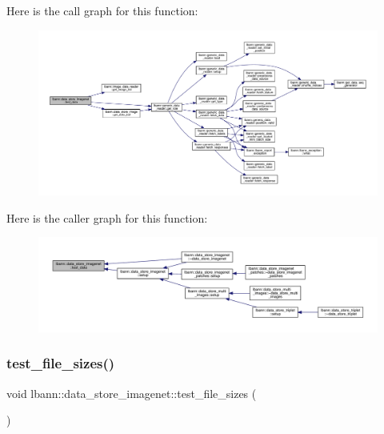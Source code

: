 Here is the call graph for this function\+:\nopagebreak
\begin{figure}[H]
\begin{center}
\leavevmode
\includegraphics[width=350pt]{classlbann_1_1data__store__imagenet_a1ed5548a409afec61489102f7f080467_cgraph}
\end{center}
\end{figure}
Here is the caller graph for this function\+:\nopagebreak
\begin{figure}[H]
\begin{center}
\leavevmode
\includegraphics[width=350pt]{classlbann_1_1data__store__imagenet_a1ed5548a409afec61489102f7f080467_icgraph}
\end{center}
\end{figure}
\mbox{\label{classlbann_1_1data__store__imagenet_a1c928ccfb4e75ffe4cefd62f37c072f8}} 
\subsubsection{\texorpdfstring{test\+\_\+file\+\_\+sizes()}{test\_file\_sizes()}}
{\footnotesize\ttfamily void lbann\+::data\+\_\+store\+\_\+imagenet\+::test\+\_\+file\+\_\+sizes (\begin{DoxyParamCaption}{ }\end{DoxyParamCaption})\hspace{0.3cm}{\ttfamily [protected]}}



